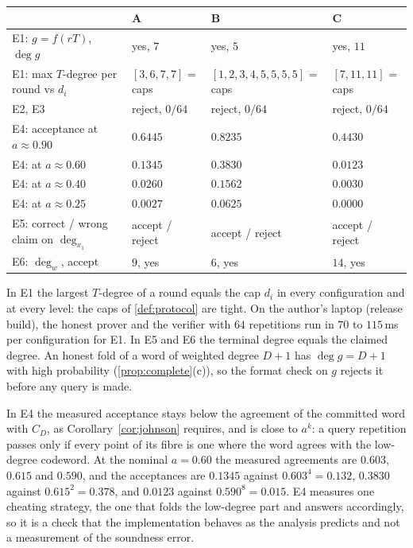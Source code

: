 \begin{center}
\small
\renewcommand{\arraystretch}{1.15}
\begin{tabular}{@{}p{4.9cm}lll@{}}
\hline
 & A & B & C \\
\hline
E1: $g=f(rT)$, $\deg g$ & yes, $7$ & yes, $5$ & yes, $11$ \\
E1: max $T$-degree per round vs $d_i$ & $[3,6,7,7]$ = caps & $[1,2,3,4,5,5,5,5]$ = caps & $[7,11,11]$ = caps \\
E2, E3 & reject, $0/64$ & reject, $0/64$ & reject, $0/64$ \\
E4: acceptance at $a\approx0.90$ & $0.6445$ & $0.8235$ & $0.4430$ \\
E4: at $a\approx0.60$ & $0.1345$ & $0.3830$ & $0.0123$ \\
E4: at $a\approx0.40$ & $0.0260$ & $0.1562$ & $0.0030$ \\
E4: at $a\approx0.25$ & $0.0027$ & $0.0625$ & $0.0000$ \\
E5: correct / wrong claim on $\deg_{x_1}$ & accept / reject & accept / reject & accept / reject \\
E6: $\deg_w$, accept & $9$, yes & $6$, yes & $14$, yes \\
\hline
\end{tabular}
\end{center}

In E1 the largest $T$-degree of a round equals the cap $d_i$ in every configuration and at
every level: the caps of \cref{def:protocol} are tight. On the author's laptop (release build), the honest
prover and the verifier with $64$ repetitions run in $70$ to
$115$\,ms per configuration for E1. In E5 and E6 the terminal degree equals the claimed degree.
An honest fold of a word of weighted degree $D+1$ has $\deg g=D+1$ with high probability
(\cref{prop:complete}(c)), so the format check on $g$ rejects it before any query is made.

In E4 the measured acceptance stays below the agreement of the committed word with $C_D$, as
Corollary~\ref{cor:johnson} requires, and is close to $a^k$: a query repetition passes only if every point
of its fibre is one where the word agrees with the low-degree codeword. At the nominal
$a=0.60$ the measured agreements are $0.603$, $0.615$ and $0.590$, and the acceptances are
$0.1345$ against $0.603^4=0.132$, $0.3830$ against $0.615^2=0.378$, and $0.0123$ against
$0.590^8=0.015$. E4 measures one cheating strategy, the one that folds the low-degree part and
answers accordingly, so it is a check that the implementation behaves as the analysis predicts
and not a measurement of the soundness error.
